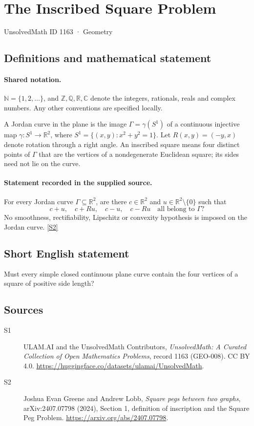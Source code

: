 \documentclass[11pt]{article}
\newcommand{\sref}[2]{\hyperlink{source:#1:#2}{[S#2]}}
\begin{document}
\setcounter{section}{1162}
\section{The Inscribed Square Problem}\label{1163}
{\small\sffamily UnsolvedMath ID 1163 · Geometry}
\subsection{Definitions and mathematical statement}

\paragraph{Shared notation.}$\mathbb N=\{1,2,\ldots\}$, and $\mathbb Z,\mathbb Q,\mathbb R,\mathbb C$ denote the integers, rationals, reals and complex numbers. Any other conventions are specified locally.


A Jordan curve in the plane is the image \(\Gamma=\gamma(S^1)\)
of a continuous injective map \(\gamma:S^1\to\mathbb R^2\), where
\(S^1=\{(x,y):x^2+y^2=1\}\).
Let \(R(x,y)=(-y,x)\) denote rotation through a right angle.
An inscribed square means four distinct points of \(\Gamma\) that
are the vertices of a nondegenerate Euclidean square; its sides
need not lie on the curve.
\paragraph{Statement recorded in the supplied source.}
For every Jordan curve \(\Gamma\subseteq\mathbb R^2\), are there
\(c\in\mathbb R^2\) and \(u\in\mathbb R^2\setminus\{0\}\) such that
\[
 c+u,\quad c+Ru,\quad c-u,\quad c-Ru
       \quad\text{all belong to }\Gamma?
\]
No smoothness, rectifiability, Lipschitz or convexity hypothesis
is imposed on the Jordan curve. \sref{1163}{2}
\subsection{Short English statement}
Must every simple closed continuous plane curve contain the four vertices of a square of positive side length?
\subsection{Sources}
\begin{description}
\item[\hypertarget{source:1163:1}{S1}] ULAM.AI and the UnsolvedMath Contributors, \emph{UnsolvedMath: A Curated Collection of Open Mathematics Problems}, record 1163 (GEO-008). CC BY 4.0. \url{https://huggingface.co/datasets/ulamai/UnsolvedMath}.
\item[\hypertarget{source:1163:2}{S2}] Joshua Evan Greene and Andrew Lobb, \emph{Square pegs between two graphs}, arXiv:2407.07798 (2024), Section 1, definition of inscription and the Square Peg Problem. \url{https://arxiv.org/abs/2407.07798}.
\end{description}
\label{end:1163}
\end{document}
